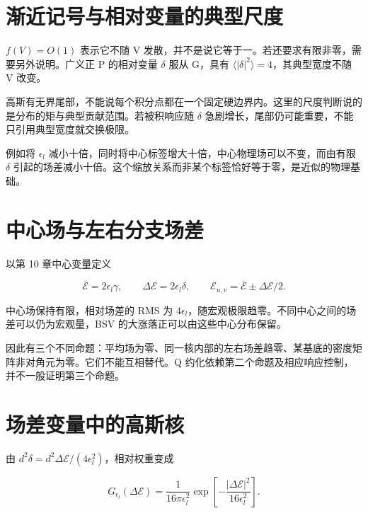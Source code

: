 \documentclass[UTF8,a4paper,zihao=-4,openany,fontset=fandol]{ctexbook}
\begin{document}
\section{渐近记号与相对变量的典型尺度}\label{sec:12:3}


$f(V)=O(1)$ 表示它不随 V 发散，并不是说它等于一。若还要求有限非零，需要另外说明。广义正 P 的相对变量 $\delta$ 服从 G，具有 $\langle|\delta|^2\rangle=4$，其典型宽度不随 V 改变。



高斯有无界尾部，不能说每个积分点都在一个固定硬边界内。这里的尺度判断说的是分布的矩与典型贡献范围。若被积响应随 $\delta$ 急剧增长，尾部仍可能重要，不能只引用典型宽度就交换极限。



例如将 $\epsilon_l$ 减小十倍，同时将中心标签增大十倍，中心物理场可以不变，而由有限 $\delta$ 引起的场差减小十倍。这个缩放关系而非某个标签恰好等于零，是近似的物理基础。



\section{中心场与左右分支场差}\label{sec:12:4}


以第 10 章中心变量定义



\begin{equation*}
\overline{\mathcal E}=2\epsilon_l\gamma,
\qquad\Delta\mathcal E=2\epsilon_l\delta,
\qquad
\mathcal E_{u,v}=\overline{\mathcal E}\pm\Delta\mathcal E/2.
\tag{12.3}\label{eq:12.3}
\end{equation*}


中心场保持有限，相对场差的 RMS 为 $4\epsilon_l$，随宏观极限趋零。不同中心之间的场差可以仍为宏观量，BSV 的大涨落正可以由这些中心分布保留。



因此有三个不同命题：平均场为零、同一核内部的左右场差趋零、某基底的密度矩阵非对角元为零。它们不能互相替代。Q 约化依赖第二个命题及相应响应控制，并不一般证明第三个命题。



\section{场差变量中的高斯核}\label{sec:12:5}


由 $d^2\delta=d^2\Delta\mathcal E/(4\epsilon_l^2)$，相对权重变成



\begin{equation*}
G_{\epsilon_l}(\Delta\mathcal E)
=\frac1{16\pi\epsilon_l^2}
\exp\!\left[-\frac{|\Delta\mathcal E|^2}{16\epsilon_l^2}\right].
\tag{12.4}\label{eq:12.4}
\end{equation*}
\end{document}
